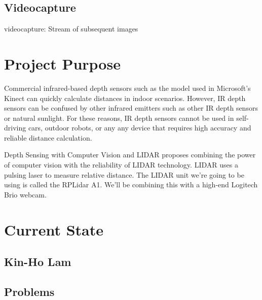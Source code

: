 \documentclass[onecolumn, draftclsnofoot,10pt, compsoc]{IEEEtran}
\begin{document}
\begin{singlespace}
		\subsection{Videocapture}\label{def:videocapture}
		videocapture: Stream of subsequent images
		
		
		
	\section{Project Purpose}
		Commercial infrared-based depth sensors such as the model used in Microsoft's Kinect can quickly calculate distances in indoor scenarios.
		However, IR depth sensors can be confused by other infrared emitters such as other IR depth sensors or natural sunlight.
		For these reasons, IR depth sensors cannot be used in self-driving cars, outdoor robots, or any any device that requires high accuracy and reliable distance calculation.

		Depth Sensing with Computer Vision and LIDAR proposes combining the power of computer vision with the reliability of LIDAR technology.
		LIDAR uses a pulsing laser to measure relative distance.
		The LIDAR unit we're going to be using is called the RPLidar A1.
		We'll be combining this with a high-end Logitech Brio webcam.

	\section{Current State}

	\subsection{Kin-Ho Lam}
	
	\subsection{Problems}
		
\end{singlespace}
\end{document}
